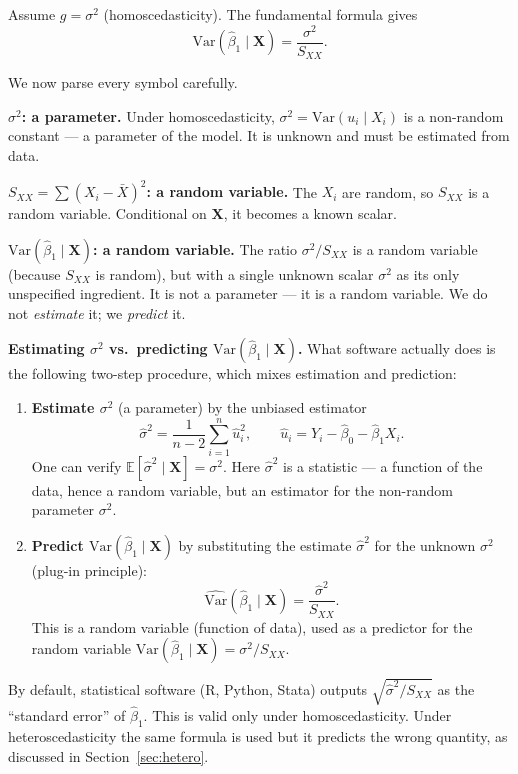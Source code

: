 \documentclass[a4paper,oneside,12pt]{extarticle}
\theoremstyle{plain}
\theoremstyle{definition}
\theoremstyle{remark}
\newcommand*{\E}{\mathbb{E}}
\newcommand*{\Var}{\mathrm{Var}}
\begin{document}
Assume $g = \sigma^2$ (homoscedasticity). The fundamental formula gives
\[
  \Var(\hat\beta_1 \mid \mathbf{X})
  = \frac{\sigma^2}{S_{XX}}.
\]

We now parse every symbol carefully.

\textbf{$\sigma^2$: a parameter.}
Under homoscedasticity, $\sigma^2 = \Var(u_i \mid X_i)$ is a
non-random constant — a parameter of the model. It is unknown and
must be estimated from data.

\textbf{$S_{XX} = \sum(X_i - \bar X)^2$: a random variable.}
The $X_i$ are random, so $S_{XX}$ is a random variable. Conditional
on $\mathbf{X}$, it becomes a known scalar.

\textbf{$\Var(\hat\beta_1 \mid \mathbf{X})$: a random variable.}
The ratio $\sigma^2/S_{XX}$ is a random variable (because $S_{XX}$ is
random), but with a single unknown scalar $\sigma^2$ as its only
unspecified ingredient. It is not a parameter — it is a random
variable. We do not \emph{estimate} it; we \emph{predict} it.

\textbf{Estimating $\sigma^2$ vs.\ predicting $\Var(\hat\beta_1 \mid \mathbf{X})$.}
What software actually does is the following two-step procedure, which
mixes estimation and prediction:
\begin{enumerate}[label=\arabic*.]
  \item \textbf{Estimate $\sigma^2$} (a parameter) by the unbiased
        estimator
        \[
          \hat\sigma^2 = \frac{1}{n-2}\sum_{i=1}^n \hat u_i^2,
          \qquad \hat u_i = Y_i - \hat\beta_0 - \hat\beta_1 X_i.
        \]
        One can verify $\E[\hat\sigma^2 \mid \mathbf{X}] = \sigma^2$.
        Here $\hat\sigma^2$ is a statistic — a function of the data,
        hence a random variable, but an estimator for the non-random
        parameter $\sigma^2$.
  \item \textbf{Predict $\Var(\hat\beta_1 \mid \mathbf{X})$} by
        substituting the estimate $\hat\sigma^2$ for the unknown
        $\sigma^2$ (plug-in principle):
        \[
          \widehat{\Var}(\hat\beta_1 \mid \mathbf{X})
          = \frac{\hat\sigma^2}{S_{XX}}.
        \]
        This is a random variable (function of data), used as a
        predictor for the random variable $\Var(\hat\beta_1 \mid
        \mathbf{X}) = \sigma^2/S_{XX}$.
\end{enumerate}

By default, statistical software (R, Python, Stata) outputs
$\sqrt{\hat\sigma^2/S_{XX}}$ as the ``standard error'' of
$\hat\beta_1$. This is valid only under homoscedasticity. Under
heteroscedasticity the same formula is used but it predicts the
wrong quantity, as discussed in Section~\ref{sec:hetero}.
\end{document}
